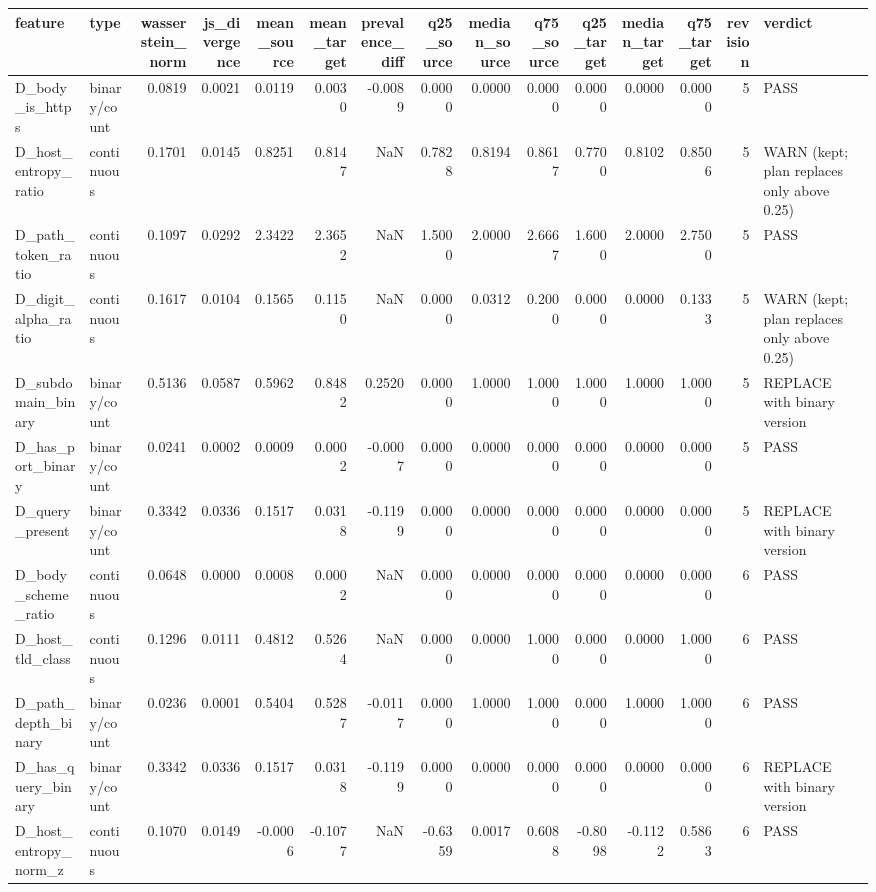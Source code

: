 \begin{tabular}{llrrrrrrrrrrrrl}
\toprule
feature & type & wasserstein\_norm & js\_divergence & mean\_source & mean\_target & prevalence\_diff & q25\_source & median\_source & q75\_source & q25\_target & median\_target & q75\_target & revision & verdict \\
\midrule
D\_body\_is\_https & binary/count & 0.0819 & 0.0021 & 0.0119 & 0.0030 & -0.0089 & 0.0000 & 0.0000 & 0.0000 & 0.0000 & 0.0000 & 0.0000 & 5 & PASS \\
D\_host\_entropy\_ratio & continuous & 0.1701 & 0.0145 & 0.8251 & 0.8147 & NaN & 0.7828 & 0.8194 & 0.8617 & 0.7700 & 0.8102 & 0.8506 & 5 & WARN (kept; plan replaces only above 0.25) \\
D\_path\_token\_ratio & continuous & 0.1097 & 0.0292 & 2.3422 & 2.3652 & NaN & 1.5000 & 2.0000 & 2.6667 & 1.6000 & 2.0000 & 2.7500 & 5 & PASS \\
D\_digit\_alpha\_ratio & continuous & 0.1617 & 0.0104 & 0.1565 & 0.1150 & NaN & 0.0000 & 0.0312 & 0.2000 & 0.0000 & 0.0000 & 0.1333 & 5 & WARN (kept; plan replaces only above 0.25) \\
D\_subdomain\_binary & binary/count & 0.5136 & 0.0587 & 0.5962 & 0.8482 & 0.2520 & 0.0000 & 1.0000 & 1.0000 & 1.0000 & 1.0000 & 1.0000 & 5 & REPLACE with binary version \\
D\_has\_port\_binary & binary/count & 0.0241 & 0.0002 & 0.0009 & 0.0002 & -0.0007 & 0.0000 & 0.0000 & 0.0000 & 0.0000 & 0.0000 & 0.0000 & 5 & PASS \\
D\_query\_present & binary/count & 0.3342 & 0.0336 & 0.1517 & 0.0318 & -0.1199 & 0.0000 & 0.0000 & 0.0000 & 0.0000 & 0.0000 & 0.0000 & 5 & REPLACE with binary version \\
D\_body\_scheme\_ratio & continuous & 0.0648 & 0.0000 & 0.0008 & 0.0002 & NaN & 0.0000 & 0.0000 & 0.0000 & 0.0000 & 0.0000 & 0.0000 & 6 & PASS \\
D\_host\_tld\_class & continuous & 0.1296 & 0.0111 & 0.4812 & 0.5264 & NaN & 0.0000 & 0.0000 & 1.0000 & 0.0000 & 0.0000 & 1.0000 & 6 & PASS \\
D\_path\_depth\_binary & binary/count & 0.0236 & 0.0001 & 0.5404 & 0.5287 & -0.0117 & 0.0000 & 1.0000 & 1.0000 & 0.0000 & 1.0000 & 1.0000 & 6 & PASS \\
D\_has\_query\_binary & binary/count & 0.3342 & 0.0336 & 0.1517 & 0.0318 & -0.1199 & 0.0000 & 0.0000 & 0.0000 & 0.0000 & 0.0000 & 0.0000 & 6 & REPLACE with binary version \\
D\_host\_entropy\_norm\_z & continuous & 0.1070 & 0.0149 & -0.0006 & -0.1077 & NaN & -0.6359 & 0.0017 & 0.6088 & -0.8098 & -0.1122 & 0.5863 & 6 & PASS \\

\end{tabular}
